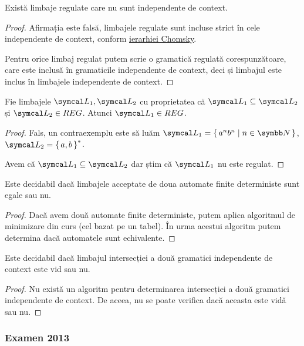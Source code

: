\begin{exercise}
    Există limbaje regulate care nu sunt independente de context.
\end{exercise}
\begin{proof}
    Afirmația este falsă, limbajele regulate sunt incluse strict în cele independente de context, conform \href{https://en.wikipedia.org/wiki/Chomsky_hierarchy}{ierarhiei Chomsky}.

    Pentru orice limbaj regulat putem scrie o gramatică regulată corespunzătoare, care este inclusă în gramaticile independente de context, deci și limbajul este inclus în limbajele independente de context.
\end{proof}

\begin{exercise}
    Fie limbajele \(\limbaj_1, \limbaj_2\) cu proprietatea că  \(\limbaj_1 \subseteq \limbaj_2\) și \(\limbaj_2 \in REG\). Atunci \(\limbaj_1 \in REG\).
\end{exercise}
\begin{proof}
    Fals, un contraexemplu este să luăm \(\limbaj_1 = \set{ a^n b^n | n \in \naturals }\), \(\limbaj_2 = \set{ a, b }^*\).

    Avem că \(\limbaj_1 \subseteq \limbaj_2\) dar știm că \(\limbaj_1\) nu este regulat.
\end{proof}

\begin{exercise}
    Este decidabil dacă limbajele acceptate de doua automate finite deterministe sunt egale sau nu.
\end{exercise}
\begin{proof}
    Dacă avem două automate finite deterministe, putem aplica algoritmul de minimizare din curs (cel bazat pe un tabel). În urma acestui algoritm putem determina dacă automatele sunt echivalente.
\end{proof}

\begin{exercise}
    Este decidabil dacă limbajul intersecției a două gramatici independente de context este vid sau nu.
\end{exercise}
\begin{proof}
    Nu există un algoritm pentru determinarea intersecției a două gramatici independente de context. De aceea, nu se poate verifica dacă aceasta este vidă sau nu.
\end{proof}

\subsubsection*{Examen 2013}

